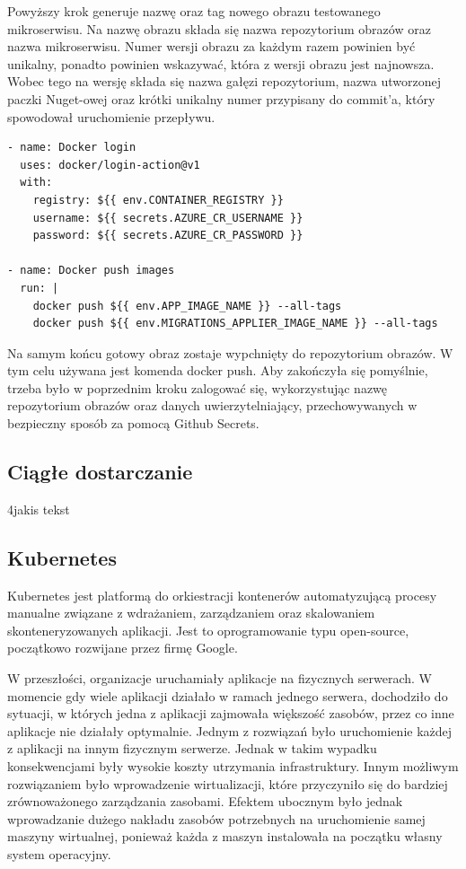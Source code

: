 \documentclass[11pt, a4]{article} %
\begin{document}
Powyższy krok generuje nazwę oraz tag nowego obrazu testowanego mikroserwisu. Na nazwę 
obrazu składa się nazwa repozytorium obrazów oraz nazwa mikroserwisu. Numer wersji 
obrazu za każdym razem powinien być unikalny, ponadto powinien wskazywać, która z 
wersji obrazu jest najnowsza. Wobec tego na wersję składa się nazwa gałęzi 
repozytorium, nazwa utworzonej paczki Nuget-owej oraz krótki unikalny numer przypisany 
do commit'a, który spowodował uruchomienie przepływu.

\begin{lstlisting}
- name: Docker login
  uses: docker/login-action@v1
  with:
    registry: ${{ env.CONTAINER_REGISTRY }}
    username: ${{ secrets.AZURE_CR_USERNAME }}
    password: ${{ secrets.AZURE_CR_PASSWORD }}

- name: Docker push images
  run: |
    docker push ${{ env.APP_IMAGE_NAME }} --all-tags
    docker push ${{ env.MIGRATIONS_APPLIER_IMAGE_NAME }} --all-tags
\end{lstlisting}

Na samym końcu gotowy obraz zostaje wypchnięty do repozytorium obrazów. W tym celu 
używana jest komenda docker push. Aby zakończyła się pomyślnie, trzeba było 
w poprzednim kroku zalogować się, wykorzystując nazwę repozytorium obrazów oraz 
danych uwierzytelniający, przechowywanych w bezpieczny sposób za pomocą Github 
Secrets.

\subsection{Ciągłe dostarczanie}
4jakis tekst
\subsection{Kubernetes}

Kubernetes jest platformą do orkiestracji kontenerów automatyzującą procesy manualne 
związane z wdrażaniem, zarządzaniem oraz skalowaniem skonteneryzowanych aplikacji. 
Jest to oprogramowanie typu open-source, początkowo rozwijane przez firmę Google.

W przeszłości, organizacje uruchamiały aplikacje na fizycznych serwerach. W momencie 
gdy wiele aplikacji działało w ramach jednego serwera, dochodziło do 
sytuacji, w których jedna z aplikacji zajmowała większość zasobów, przez co inne 
aplikacje nie działały optymalnie. Jednym z rozwiązań było uruchomienie każdej 
z aplikacji na innym fizycznym serwerze. Jednak w takim wypadku konsekwencjami były 
wysokie koszty utrzymania infrastruktury. Innym możliwym rozwiązaniem było wprowadzenie 
wirtualizacji, które przyczyniło się do bardziej zrównoważonego zarządzania zasobami. 
Efektem ubocznym było jednak wprowadzanie dużego nakładu zasobów potrzebnych na 
uruchomienie samej maszyny wirtualnej, ponieważ każda z maszyn instalowała na początku 
własny system operacyjny.
\end{document}
